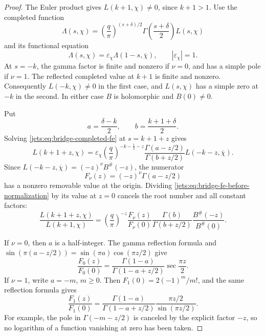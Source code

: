 \begin{proof}
The Euler product gives \(L(k+1,\chi)\ne0\), since \(k+1>1\).
Use the completed function
\[
 \Lambda(s,\chi)=
 \left(\frac q\pi\right)^{(s+\delta)/2}
 \Gamma\!\left(\frac{s+\delta}{2}\right)L(s,\chi)
\]
and its functional equation
\begin{equation}
 \Lambda(s,\chi)=\varepsilon_\chi\Lambda(1-s,\overline\chi),
 \qquad |\varepsilon_\chi|=1.
 \label{jets:eq:bridge-completed-fe}
\end{equation}
At \(s=-k\), the gamma factor is finite and nonzero if
\(\nu=0\), and has a simple pole if \(\nu=1\).
The reflected completed value at \(k+1\) is finite and nonzero.
Consequently \(L(-k,\chi)\ne0\) in the first case, and
\(L(s,\chi)\) has a simple zero at \(-k\) in the second.
In either case \(B\) is holomorphic and \(B(0)\ne0\).

Put
\[
 a=\frac{\delta-k}{2},\qquad
 b=\frac{k+1+\delta}{2}.
\]
Solving \eqref{jets:eq:bridge-completed-fe} at \(s=k+1+z\) gives
\begin{equation}
 L(k+1+z,\chi)
 =\varepsilon_\chi
 \left(\frac q\pi\right)^{-k-\frac12-z}
 \frac{\Gamma(a-z/2)}{\Gamma(b+z/2)}
 L(-k-z,\overline\chi).
 \label{jets:eq:bridge-fe-before-normalization}
\end{equation}
Since
\(L(-k-z,\overline\chi)=(-z)^\nu B^\#(-z)\),
the numerator
\[
 F_\nu(z)=(-z)^\nu\Gamma(a-z/2)
\]
has a nonzero removable value at the origin.
Dividing \eqref{jets:eq:bridge-fe-before-normalization} by its value
at \(z=0\) cancels the root number and all constant factors:
\begin{equation}
 \frac{L(k+1+z,\chi)}{L(k+1,\chi)}
 =
 \left(\frac q\pi\right)^{-z}
 \frac{F_\nu(z)}{F_\nu(0)}
 \frac{\Gamma(b)}{\Gamma(b+z/2)}
 \frac{B^\#(-z)}{B^\#(0)}.
 \label{jets:eq:bridge-normalized-intermediate}
\end{equation}

If \(\nu=0\), then \(a\) is a half-integer.
The gamma reflection formula and
\(\sin(\pi(a-z/2))=\sin(\pi a)\cos(\pi z/2)\)
give
\begin{equation}
 \frac{F_0(z)}{F_0(0)}
 =\frac{\Gamma(1-a)}{\Gamma(1-a+z/2)}
       \sec\frac{\pi z}{2}.
 \label{jets:eq:bridge-gamma-half-integer}
\end{equation}
If \(\nu=1\), write \(a=-m\), \(m\geq0\).
Then \(F_1(0)=2(-1)^m/m!\), and the same reflection formula
gives
\begin{equation}
 \frac{F_1(z)}{F_1(0)}
 =\frac{\Gamma(1-a)}{\Gamma(1-a+z/2)}
       \frac{\pi z/2}{\sin(\pi z/2)}.
 \label{jets:eq:bridge-gamma-integer}
\end{equation}
For example, the pole in \(\Gamma(-m-z/2)\) is canceled by
the explicit factor \(-z\), so no logarithm of a function
vanishing at zero has been taken.


\end{proof}
